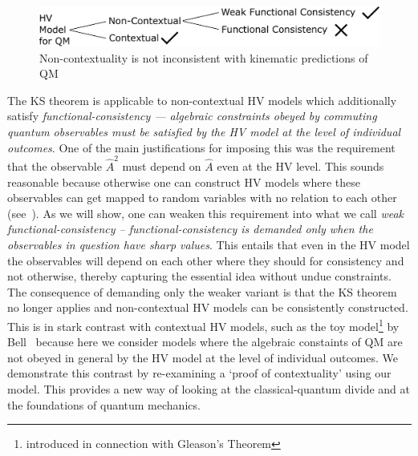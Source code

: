 \documentclass[doublecol,british]{epl2}
\theoremstyle{plain}
\theoremstyle{plain}
\theoremstyle{definition}
\theoremstyle{remark}
\theoremstyle{remark}
\theoremstyle{remark}
\theoremstyle{plain}
\theoremstyle{plain}
\theoremstyle{plain}
\theoremstyle{definition}
\theoremstyle{definition}
\begin{document}
\begin{figure}[h]
\begin{center}
\includegraphics[width=0.98\columnwidth]{block2}
\end{center}
\caption{Non-contextuality is not inconsistent
with kinematic predictions of QM} \label{fig:block}\end{figure}
{
The KS theorem is applicable to non-contextual HV models
which additionally satisfy \emph{functional-consistency ---
algebraic constraints obeyed by commuting quantum
observables must be satisfied by the HV model at the level
of individual outcomes}. 
One of the main justifications for imposing
this was the requirement that
{ the} observable $\hat A^2$ must depend on $\hat
A$ even at the HV level. This sounds reasonable because
otherwise one can construct HV models where these
observables { can} get mapped to random variables
with no relation to each other (see~\cite{KochenSpecker}). 
As we
will show, one can weaken this requirement into what we call
\emph{weak functional-consistency -- functional-consistency is
demanded only when the observables in question have sharp
values}. This entails that even in the HV model the
observables will depend on each other where they should for
{ consistency} and not otherwise,
thereby capturing the essential idea { without undue
constraints}. The consequence of
demanding only the weaker variant is that the KS theorem no
longer applies and non-contextual HV models can be
consistently constructed. This is in stark contrast with
contextual HV models, such as the toy
model\footnote{introduced in connection with Gleason's
Theorem} by Bell~\cite{BellOnHiddenVariables} because
here we consider models where the algebraic constaints of 
QM are not obeyed in general by the HV model at the level of
individual outcomes. We demonstrate this contrast
by re-examining a `proof of contextuality' using
our model.}
This provides a new
way of looking at the classical-quantum divide and at
the foundations of quantum mechanics.
\end{document}
